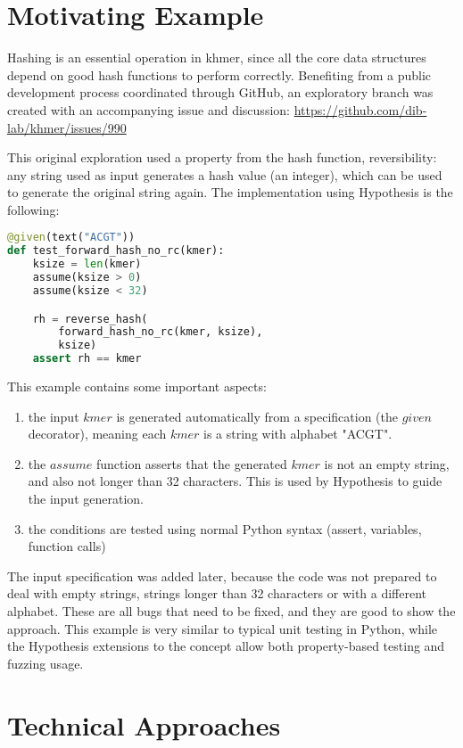 \documentclass[preprint,nocopyrightspace]{sig-alternate}
\begin{document}
\section{Motivating Example}

Hashing is an essential operation in khmer,
since all the core data structures depend on good hash functions to perform correctly.
Benefiting from a public development process coordinated through GitHub,
an exploratory branch was created with an accompanying issue and discussion:
\url{https://github.com/dib-lab/khmer/issues/990}

This original exploration used a property from the hash function,
reversibility:
any string used as input generates a hash value (an integer),
which can be used to generate the original string again.
The implementation using Hypothesis is the following:

\begin{lstlisting}[language=Python]
@given(text("ACGT"))
def test_forward_hash_no_rc(kmer):
    ksize = len(kmer)
    assume(ksize > 0)
    assume(ksize < 32)

    rh = reverse_hash(
        forward_hash_no_rc(kmer, ksize),
        ksize)
    assert rh == kmer
\end{lstlisting}

This example contains some important aspects:
\begin{enumerate}
\item the input $kmer$ is generated automatically from a specification (the $given$ decorator),
meaning each $kmer$ is a string with alphabet "ACGT".
\item the $assume$ function asserts that the generated $kmer$ is not an empty string,
and also not longer than 32 characters.
This is used by Hypothesis to guide the input generation.
\item the conditions are tested using normal Python syntax (assert, variables, function calls)
\end{enumerate}

The input specification was added later,
because the code was not prepared to deal with empty strings,
strings longer than 32 characters or with a different alphabet.
These are all bugs that need to be fixed,
and they are good to show the approach.
This example is very similar to typical unit testing in Python,
while the Hypothesis extensions to the concept allow both property-based testing and fuzzing usage.

\section{Technical Approaches}
\end{document}
